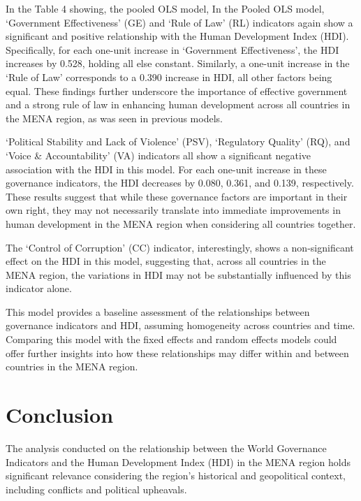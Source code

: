 \documentclass[
  12pt,
]{article}
\begin{document}
In the Table 4 showing, the pooled OLS model,
In the Pooled OLS model, `Government Effectiveness' (GE) and `Rule of Law' (RL) indicators again show a significant and positive relationship with the Human Development Index (HDI). Specifically, for each one-unit increase in `Government Effectiveness', the HDI increases by 0.528, holding all else constant. Similarly, a one-unit increase in the `Rule of Law' corresponds to a 0.390 increase in HDI, all other factors being equal. These findings further underscore the importance of effective government and a strong rule of law in enhancing human development across all countries in the MENA region, as was seen in previous models.

`Political Stability and Lack of Violence' (PSV), `Regulatory Quality' (RQ), and `Voice \& Accountability' (VA) indicators all show a significant negative association with the HDI in this model. For each one-unit increase in these governance indicators, the HDI decreases by 0.080, 0.361, and 0.139, respectively. These results suggest that while these governance factors are important in their own right, they may not necessarily translate into immediate improvements in human development in the MENA region when considering all countries together.

The `Control of Corruption' (CC) indicator, interestingly, shows a non-significant effect on the HDI in this model, suggesting that, across all countries in the MENA region, the variations in HDI may not be substantially influenced by this indicator alone.

This model provides a baseline assessment of the relationships between governance indicators and HDI, assuming homogeneity across countries and time. Comparing this model with the fixed effects and random effects models could offer further insights into how these relationships may differ within and between countries in the MENA region.

\hypertarget{conclusion}{%
\section{Conclusion}\label{conclusion}}

The analysis conducted on the relationship between the World Governance Indicators and the Human Development Index (HDI) in the MENA region
holds significant relevance considering the region's historical and geopolitical context, including conflicts and political upheavals.
\end{document}
